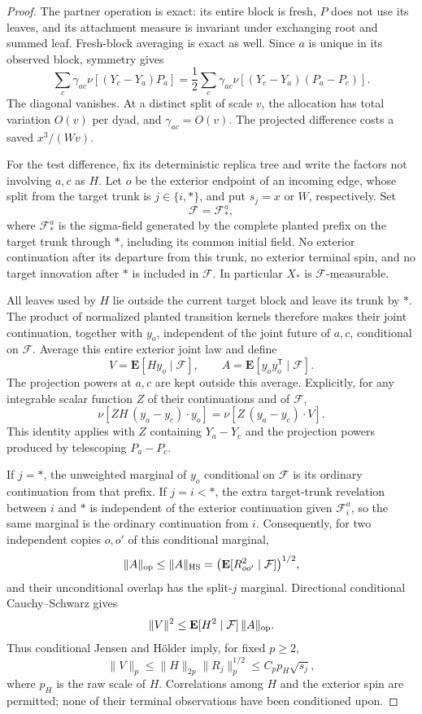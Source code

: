 \begin{proof}
The partner operation is exact: its entire block is fresh,
\(P\) does not use its leaves, and its attachment measure
is invariant under exchanging root and summed leaf.
Fresh-block averaging is exact as well. Since \(a\)
is unique in its observed block, symmetry gives
\[
 \sum_c\gamma_{ac}\nu[(Y_c-Y_a)P_a]
   =\frac12\sum_c\gamma_{ac}
                            \nu[(Y_c-Y_a)(P_a-P_c)].
\]
The diagonal vanishes. At a distinct split of scale \(v\),
the allocation has total variation \(O(v)\) per dyad,
and \(\gamma_{ac}=O(v)\). The projected difference
costs a saved \(x^3/(Wv)\).

For the test difference, fix its deterministic replica
tree and write the factors not involving \(a,c\) as \(H\).
Let \(o\) be the exterior endpoint of an incoming edge,
whose split from the target trunk is \(j\in\{i,*\}\),
and put \(s_j=x\) or \(W\), respectively.
Set
\[
                         \mathcal F=\mathcal F_*^a,
\]
where \(\mathcal F_*^a\) is the sigma-field generated
by the complete planted prefix on the target trunk
through \(*\), including its common initial field.
No exterior continuation after its departure from
this trunk, no exterior terminal spin, and no target
innovation after \(*\) is included in \(\mathcal F\).
In particular \(X_*\) is \(\mathcal F\)-measurable.

All leaves used by \(H\) lie outside the current target
block and leave its trunk by \(*\). The product of
normalized planted transition kernels therefore makes
their joint continuation, together with \(y_o\),
independent of the joint future of \(a,c\), conditional
on \(\mathcal F\). Average this entire exterior joint
law and define
\[
 V=\mathbf E[Hy_o\mid\mathcal F],
       \qquad A=\mathbf E[y_oy_o^{\mathsf T}\mid\mathcal F].
\]
The projection powers at \(a,c\) are kept outside this
average. Explicitly, for any integrable scalar function
\(Z\) of their continuations and of \(\mathcal F\),
\[
 \nu[ZH\,(y_a-y_c)\cdot y_o]
             =\nu[Z\,(y_a-y_c)\cdot V].
\]
This identity applies with \(Z\) containing
\(Y_a-Y_c\) and the projection powers produced by
telescoping \(P_a-P_c\).

If \(j=*\), the unweighted marginal of \(y_o\)
conditional on \(\mathcal F\) is its ordinary
continuation from that prefix. If \(j=i<*\),
the extra target-trunk revelation between \(i\)
and \(*\) is independent of the exterior continuation
given \(\mathcal F_i^a\), so the same marginal
is the ordinary continuation from \(i\).
Consequently, for two independent copies \(o,o'\)
of this conditional marginal,
\[
 \|A\|_{\rm op}\le\|A\|_{\rm HS}
       =\bigl(\mathbf E[R_{oo'}^2\mid\mathcal F]\bigr)^{1/2},
\]
and their unconditional overlap has the split-\(j\)
marginal. Directional conditional Cauchy--Schwarz gives
\[
 \|V\|^2\le\mathbf E[H^2\mid\mathcal F]\,\|A\|_{\rm op}.
\]
Thus conditional Jensen and H\"older imply, for fixed
\(p\ge2\),
\[
 \|V\|_p\le\|H\|_{2p}\|R_j\|_p^{1/2}
                       \le C_p p_H\sqrt{s_j},
\]
where \(p_H\) is the raw scale of \(H\).
Correlations among \(H\) and the exterior spin are
permitted; none of their terminal observations
have been conditioned upon.


\end{proof}
